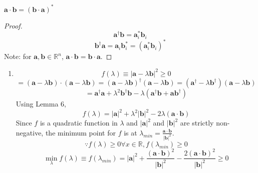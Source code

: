 \begin{sol}
\begin{lemma}
$\mathbf{a}\cdot\mathbf{b}=(\mathbf{b}\cdot\mathbf{a})^*$
\end{lemma}
\begin{proof} 
\begin{equation}
	\mathbf a^\dagger\mathbf b=\mathbf{a}_i^*\mathbf{b}_i
\end{equation}
\begin{equation}
	\mathbf b^\dagger\mathbf a=\mathbf{a}_i\mathbf{b}_i^*=(\mathbf a^*_i\mathbf b_i)^*
\end{equation}
Note: for $\mathbf a, \mathbf b\in\mathbb{R}^n$, $\mathbf{a}\cdot\mathbf{b}=\mathbf{b}\cdot\mathbf{a}$.
\end{proof}
\begin{enumerate}[label=\textbf{(\alph*)}]
\item
\begin{equation}
	f(\lambda)\equiv|\mathbf{a}-\lambda\mathbf{b}|^2\geq 0
\end{equation} 
\begin{equation}
	=(\mathbf{a}-\lambda\mathbf{b})\cdot(\mathbf{a}-\lambda\mathbf{b})=(\mathbf{a}-\lambda\mathbf{b})^\dagger(\mathbf{a}-\lambda\mathbf{b})=(\mathbf{a}^\dagger-\lambda\mathbf{b}^\dagger)(\mathbf{a}-\lambda\mathbf{b})
\end{equation} 
\begin{equation}
	=\mathbf{a}^\dagger\mathbf a+\lambda^2\mathbf b^\dagger \mathbf b-\lambda (\mathbf a^\dagger\mathbf b+\mathbf{ab}^\dagger)
\end{equation}
Using Lemma 6,
\begin{equation}
	f(\lambda)=|\mathbf{a}|^2+\lambda^2|\mathbf{b}|^2-2\lambda (\mathbf a\cdot\mathbf b)
\end{equation}
Since $f$ is a quadratic function in $\lambda$ and $|\mathbf{a}|^2$ and $|\mathbf{b}|^2$ are strictly non-negative, the minimum point for $f$ is at $\lambda_{min}=\frac{\mathbf{a}\cdot\mathbf{b}}{|\mathbf{b}|^2}$. \begin{equation}
	\because f(\lambda)\geq 0\forall x\in\mathbb{R}, f(\lambda_{min})\geq 0
\end{equation} 
\begin{equation}
	\min_{\lambda}f(\lambda)\equiv f(\lambda_{min})=|\mathbf{a}|^2+\frac{(\mathbf{a}\cdot\mathbf{b})^2}{|\mathbf{b}|^2}-\frac{2(\mathbf{a}\cdot\mathbf{b})^2}{|\mathbf{b}|^2}\geq 0
\end{equation}
\begin{equation}

\end{equation}
\end{enumerate}
\end{sol}
